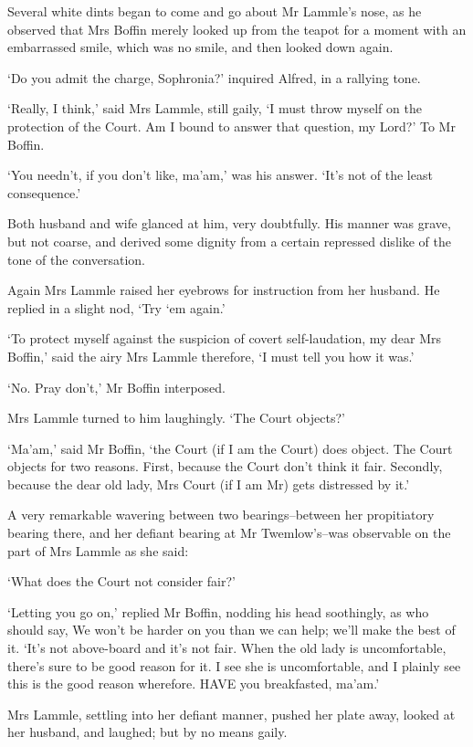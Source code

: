 Several white dints began to come and go about Mr Lammle’s nose, as he
observed that Mrs Boffin merely looked up from the teapot for a moment
with an embarrassed smile, which was no smile, and then looked down
again.

‘Do you admit the charge, Sophronia?’ inquired Alfred, in a rallying
tone.

‘Really, I think,’ said Mrs Lammle, still gaily, ‘I must throw myself
on the protection of the Court. Am I bound to answer that question, my
Lord?’ To Mr Boffin.

‘You needn’t, if you don’t like, ma’am,’ was his answer. ‘It’s not of
the least consequence.’

Both husband and wife glanced at him, very doubtfully. His manner was
grave, but not coarse, and derived some dignity from a certain repressed
dislike of the tone of the conversation.

Again Mrs Lammle raised her eyebrows for instruction from her husband.
He replied in a slight nod, ‘Try ‘em again.’

‘To protect myself against the suspicion of covert self-laudation, my
dear Mrs Boffin,’ said the airy Mrs Lammle therefore, ‘I must tell you
how it was.’

‘No. Pray don’t,’ Mr Boffin interposed.

Mrs Lammle turned to him laughingly. ‘The Court objects?’

‘Ma’am,’ said Mr Boffin, ‘the Court (if I am the Court) does object. The
Court objects for two reasons. First, because the Court don’t think it
fair. Secondly, because the dear old lady, Mrs Court (if I am Mr) gets
distressed by it.’

A very remarkable wavering between two bearings--between her
propitiatory bearing there, and her defiant bearing at Mr Twemlow’s--was
observable on the part of Mrs Lammle as she said:

‘What does the Court not consider fair?’

‘Letting you go on,’ replied Mr Boffin, nodding his head soothingly, as
who should say, We won’t be harder on you than we can help; we’ll make
the best of it. ‘It’s not above-board and it’s not fair. When the old
lady is uncomfortable, there’s sure to be good reason for it. I see she
is uncomfortable, and I plainly see this is the good reason wherefore.
HAVE you breakfasted, ma’am.’

Mrs Lammle, settling into her defiant manner, pushed her plate away,
looked at her husband, and laughed; but by no means gaily.

